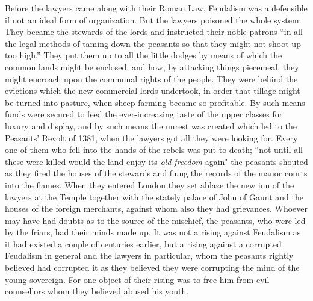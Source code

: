 \documentclass{book}
\begin{document}
Before the lawyers came along with their Roman Law, Feudalism was a defensible if not an ideal form of organization. But the lawyers poisoned the whole system. They became the stewards of the lords and instructed their noble patrons “in all the legal methods of taming down the peasants so that they might not shoot up too high.” They put them up to all the little dodges by means of which the common lands might be enclosed, and how, by attacking things piecemeal, they might encroach upon the communal rights of the people. They were behind the evictions which the new commercial lords undertook, in order that tillage might be turned into pasture, when sheep-farming became so profitable. By such means funds were secured to feed the ever-increasing taste of the upper classes for luxury and display, and by such means the unrest was created which led to the Peasants’ Revolt of 1381, when the lawyers got all they were looking for. Every one of them who fell into the hands of the rebels was put to death; “not until all these were killed would the land enjoy its \emph{old freedom} again" the peasants shouted as they fired the houses of the stewards and flung the records of the manor courts into the flames. When they entered London they set ablaze the new inn of the lawyers at the Temple together with the stately palace of John of Gaunt and the houses of the foreign merchants, against whom also they had grievances. Whoever may have had doubts as to the source of the mischief, the peasants, who were led by the friars, had their minds made up. It was not a rising against Feudalism as it had existed a couple of centuries earlier, but a rising against a corrupted Feudalism in general and the lawyers in particular, whom the peasants rightly believed had corrupted it as they believed they were corrupting the mind of the young sovereign. For one object of their rising was to free him from evil counsellors whom they believed abused his youth.
\end{document}
